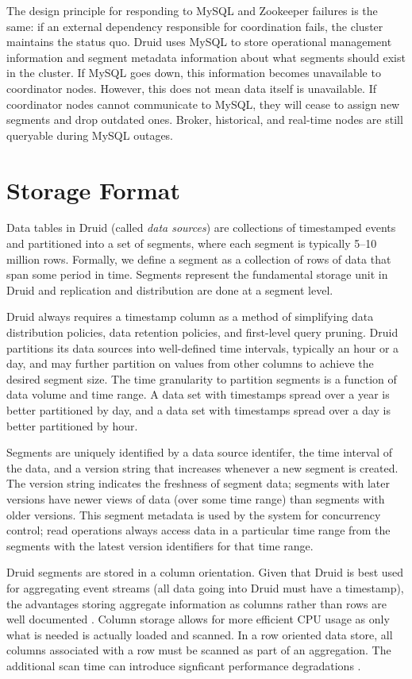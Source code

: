 \documentclass{sig-alternate-2013}
\begin{document}
The design principle for responding to MySQL and Zookeeper failures is the
same: if an external dependency responsible for coordination fails, the cluster
maintains the status quo. Druid uses MySQL to store operational management
information and segment metadata information about what segments should exist
in the cluster.  If MySQL goes down, this information becomes unavailable to
coordinator nodes. However, this does not mean data itself is unavailable. If
coordinator nodes cannot communicate to MySQL, they will cease to assign new
segments and drop outdated ones. Broker, historical, and real-time nodes are still
queryable during MySQL outages.

\section{Storage Format}
\label{sec:storage-format}
Data tables in Druid (called \emph{data sources}) are collections of
timestamped events and partitioned into a set of segments, where each segment
is typically 5--10 million rows. Formally, we define a segment as a collection
of rows of data that span some period in time. Segments represent the
fundamental storage unit in Druid and replication and distribution are done at
a segment level.
 
Druid always requires a timestamp column as a method of simplifying data
distribution policies, data retention policies, and first-level query pruning.
Druid partitions its data sources into well-defined time intervals, typically
an hour or a day, and may further partition on values from other columns to
achieve the desired segment size. The time granularity
to partition segments is a function of data volume and time range. A data set
with timestamps spread over a year is better partitioned by day, and a data set
with timestamps spread over a day is better partitioned by hour.

Segments are uniquely identified by a data source identifer, the time interval
of the data, and a version string that increases whenever a new segment is
created.  The version string indicates the freshness of segment data; segments
with later versions have newer views of data (over some time range) than
segments with older versions.  This segment metadata is used by the system for
concurrency control; read operations always access data in a particular time
range from the segments with the latest version identifiers for that time
range.

Druid segments are stored in a column orientation. Given that Druid is best
used for aggregating event streams (all data going into Druid must have a
timestamp), the advantages storing aggregate information as columns rather than
rows are well documented \cite{abadi2008column}. Column storage allows for more
efficient CPU usage as only what is needed is actually loaded and scanned. In a
row oriented data store, all columns associated with a row must be scanned as
part of an aggregation. The additional scan time can introduce signficant performance
degradations \cite{abadi2008column}.
\end{document}
